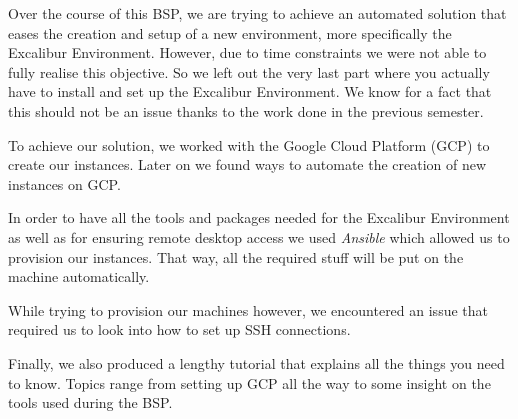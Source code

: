 %
%
%
%

Over the course of this BSP, we are trying to achieve an automated
solution that eases the creation and setup of a new environment, more
specifically the Excalibur Environment. However, due to time
constraints we were not able to fully realise this objective. So we
left out the very last part where you actually have to install and set
up the Excalibur Environment. We know for a fact that this should not
be an issue thanks to the work done in the previous semester.

To achieve our solution, we worked with the Google Cloud Platform
(GCP) to create our instances. Later on we found ways to automate the
creation of new instances on GCP. 

In order to have all the tools and packages needed for the Excalibur
Environment as well as for ensuring remote desktop access we used
\textit{Ansible} which allowed us to provision our instances. That
way, all the required stuff will be put on the machine automatically.

While trying to provision our machines however, we encountered an
issue that required us to look into how to set up SSH connections.

Finally, we also produced a lengthy tutorial that explains all the
things you need to know. Topics range from setting up GCP all the way
to some insight on the tools used during the BSP.
